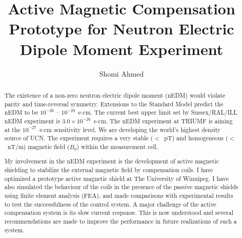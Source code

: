 
\title{Active Magnetic Compensation Prototype for Neutron Electric Dipole Moment Experiment}
\author{Shomi Ahmed}

%
%
%





\maketitle

\begin{abstract}
The existence of a non-zero neutron electric dipole moment (nEDM) would violate parity and time-reversal symmetry.  Extensions to the Standard Model predict the nEDM to be $10^{-26}$ -- $10^{-28}$~e$\cdot$cm.  The current best upper limit set by Sussex/RAL/ILL nEDM experiment is $3.0 \times 10^{-26}$~e$\cdot$cm\cite{bestLim_1,bestLim_2}.  The nEDM experiment at TRIUMF is aiming at the $10^{-27}$~e$\cdot$cm sensitivity level.  We are developing the world's highest density source of UCN.  The experiment requires a very stable ($<$~pT) and homogeneous ($<$~nT/m) magnetic field ($B_0$) within the measurement cell.  

My involvement in the nEDM experiment is the development of active magnetic shielding to stabilize the external magnetic field by compensation coils. I have optimized a prototype active magnetic shield at The University of Winnipeg. I have also simulated the behaviour of the coils in the presence of the passive magnetic shields  using finite element analysis (FEA), and made comparisons with  experimental results  to test the successfulness of the control system. A major challenge of the active 
compensation system is its  slow current response.  This is now understood and several recommendations are made to improve the performance in future realizations of such a system.





\end{abstract}

